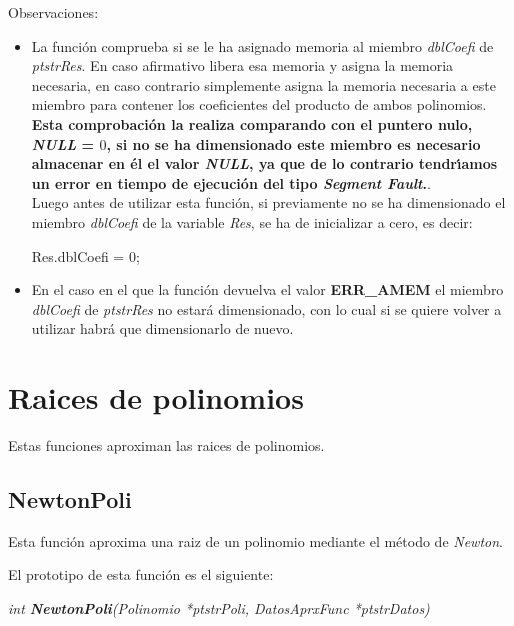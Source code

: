 Observaciones:

\begin{itemize}
\item La funci\'on comprueba si se le ha asignado memoria al miembro 
\emph{dblCoefi} de \emph{ptstrRes}. En caso afirmativo libera esa
memoria y asigna la memoria necesaria, en caso contrario simplemente asigna
la memoria necesaria a este miembro para contener los coeficientes del
producto de ambos polinomios.\\

\textbf{Esta comprobaci\'on la realiza comparando con el puntero nulo, 
\emph{NULL} = $0$, si no se ha dimensionado este miembro es necesario almacenar
en \'el el valor \emph{NULL}, ya que de lo contrario tendr\'{\i}amos un error
en tiempo de ejecuci\'on del tipo \emph{Segment Fault}.}.\\

Luego antes de utilizar esta funci\'on, si previamente no se ha dimensionado
el miembro \emph{dblCoefi} de la variable \emph{Res}, se ha de inicializar
a cero, es decir:

\begin{center}
Res.dblCoefi = 0;
\end{center}
\item En el caso en el que la funci\'on devuelva el valor \textbf{ERR\_AMEM} el
miembro \emph{dblCoefi} de \emph{ptstrRes} no estar\'a dimensionado, con lo
cual si se quiere volver a utilizar habr\'a que dimensionarlo de nuevo.
\end{itemize}

\section{Raices de polinomios}

Estas funciones aproximan las raices de polinomios.

\subsection{NewtonPoli}

Esta funci\'on aproxima una raiz de un polinomio mediante el m\'etodo
de \emph{Newton}.\newline

El prototipo de esta funci\'on es el siguiente:

\begin{center}
\emph{int \textbf{NewtonPoli}(Polinomio *ptstrPoli, DatosAprxFunc *ptstrDatos)}
\end{center}


